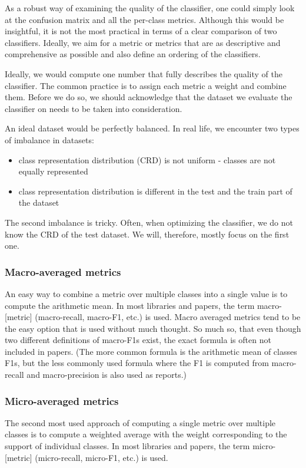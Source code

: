 As a robust way of examining the quality of the classifier, one could simply look at the confusion matrix and all the per-class metrics. Although this would be insightful, it is not the most practical in terms of a clear comparison of two classifiers. Ideally, we aim for a metric or metrics that are as descriptive and comprehensive as possible and also define an ordering of the classifiers.

Ideally, we would compute one number that fully describes the quality of the classifier. The common practice is to assign each metric a weight and combine them. Before we do so, we should acknowledge that the dataset we evaluate the classifier on needs to be taken into consideration.

An ideal dataset would be perfectly balanced. In real life, we encounter two types of imbalance in datasets:

\begin{itemize}
\item class representation distribution (CRD) is not uniform - classes are not equally represented 

\item class representation distribution is different in the test and the train part of the dataset
\end{itemize}
The second imbalance is tricky. Often, when optimizing the classifier, we do not know the CRD of the test dataset. We will, therefore, mostly focus on the first one. 


\subsubsection{Macro-averaged metrics}

An easy way to combine a metric over multiple classes into a single value is to compute the arithmetic mean. In most libraries and papers, the term macro-[metric] (macro-recall, macro-F1, etc.) is used.  Macro averaged metrics tend to be the easy option that is used without much thought. So much so, that even though two different definitions of macro-F1s exist, the exact formula is often not included in papers. (The more common formula is the arithmetic mean of classes F1s, but the less commonly used formula where the F1 is computed from macro-recall and macro-precision is also used as  \cite{Opitz2019MacroFA} reports.)

\subsubsection{Micro-averaged metrics}
The second most used approach of computing a single metric over multiple classes is to compute a weighted average with the weight corresponding to the support of individual classes. In most libraries and papers, the term micro-[metric] (micro-recall, micro-F1, etc.) is used. 

